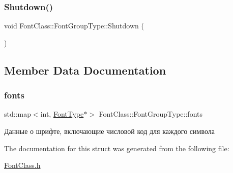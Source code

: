 \mbox{\label{struct_font_class_1_1_font_group_type_afed1809b716cfa6dd6c5d33bf643639d}} 
\subsubsection{\texorpdfstring{Shutdown()}{Shutdown()}}
{\footnotesize\ttfamily void Font\+Class\+::\+Font\+Group\+Type\+::\+Shutdown (\begin{DoxyParamCaption}{ }\end{DoxyParamCaption})\hspace{0.3cm}{\ttfamily [inline]}}



\subsection{Member Data Documentation}
\mbox{\label{struct_font_class_1_1_font_group_type_a3f9205834f177eedffec9ea36ce6c9b3}} 
\subsubsection{\texorpdfstring{fonts}{fonts}}
{\footnotesize\ttfamily std\+::map$<$int, \hyperlink{struct_font_class_1_1_font_type}{Font\+Type}$\ast$$>$ Font\+Class\+::\+Font\+Group\+Type\+::fonts}



Данные о шрифте, включающие числовой код для каждого символа 



The documentation for this struct was generated from the following file\+:\begin{DoxyCompactItemize}
\item 
\hyperlink{_font_class_8h}{Font\+Class.\+h}\end{DoxyCompactItemize}
